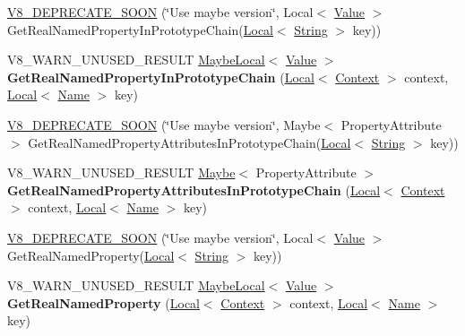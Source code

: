 \begin{DoxyCompactItemize}
\item 
\hyperlink{classv8_1_1Object_a2451d74f20c3c8c5792d2179df34d2de}{V8\+\_\+\+D\+E\+P\+R\+E\+C\+A\+T\+E\+\_\+\+S\+O\+O\+N} (\char`\"{}Use maybe version\char`\"{}, Local$<$ \hyperlink{classv8_1_1Value}{Value} $>$ Get\+Real\+Named\+Property\+In\+Prototype\+Chain(\hyperlink{classv8_1_1Local}{Local}$<$ \hyperlink{classv8_1_1String}{String} $>$ key))
\item 
\hypertarget{classv8_1_1Object_afe68d490fc41783e30126ca547b7fc90}{}V8\+\_\+\+W\+A\+R\+N\+\_\+\+U\+N\+U\+S\+E\+D\+\_\+\+R\+E\+S\+U\+L\+T \hyperlink{classv8_1_1MaybeLocal}{Maybe\+Local}$<$ \hyperlink{classv8_1_1Value}{Value} $>$ {\bfseries Get\+Real\+Named\+Property\+In\+Prototype\+Chain} (\hyperlink{classv8_1_1Local}{Local}$<$ \hyperlink{classv8_1_1Context}{Context} $>$ context, \hyperlink{classv8_1_1Local}{Local}$<$ \hyperlink{classv8_1_1Name}{Name} $>$ key)\label{classv8_1_1Object_afe68d490fc41783e30126ca547b7fc90}

\item 
\hyperlink{classv8_1_1Object_ac5755869ab0b95f6c1bbd3dd123e5cf4}{V8\+\_\+\+D\+E\+P\+R\+E\+C\+A\+T\+E\+\_\+\+S\+O\+O\+N} (\char`\"{}Use maybe version\char`\"{}, Maybe$<$ Property\+Attribute $>$ Get\+Real\+Named\+Property\+Attributes\+In\+Prototype\+Chain(\hyperlink{classv8_1_1Local}{Local}$<$ \hyperlink{classv8_1_1String}{String} $>$ key))
\item 
\hypertarget{classv8_1_1Object_aab7c2e5c5659e95e97488e01b04bf3c8}{}V8\+\_\+\+W\+A\+R\+N\+\_\+\+U\+N\+U\+S\+E\+D\+\_\+\+R\+E\+S\+U\+L\+T \hyperlink{classv8_1_1Maybe}{Maybe}$<$ Property\+Attribute $>$ {\bfseries Get\+Real\+Named\+Property\+Attributes\+In\+Prototype\+Chain} (\hyperlink{classv8_1_1Local}{Local}$<$ \hyperlink{classv8_1_1Context}{Context} $>$ context, \hyperlink{classv8_1_1Local}{Local}$<$ \hyperlink{classv8_1_1Name}{Name} $>$ key)\label{classv8_1_1Object_aab7c2e5c5659e95e97488e01b04bf3c8}

\item 
\hyperlink{classv8_1_1Object_a82e0bc7d399264127f911e4167d730b1}{V8\+\_\+\+D\+E\+P\+R\+E\+C\+A\+T\+E\+\_\+\+S\+O\+O\+N} (\char`\"{}Use maybe version\char`\"{}, Local$<$ \hyperlink{classv8_1_1Value}{Value} $>$ Get\+Real\+Named\+Property(\hyperlink{classv8_1_1Local}{Local}$<$ \hyperlink{classv8_1_1String}{String} $>$ key))
\item 
\hypertarget{classv8_1_1Object_aecec39cefb3e394e1696fe618862efec}{}V8\+\_\+\+W\+A\+R\+N\+\_\+\+U\+N\+U\+S\+E\+D\+\_\+\+R\+E\+S\+U\+L\+T \hyperlink{classv8_1_1MaybeLocal}{Maybe\+Local}$<$ \hyperlink{classv8_1_1Value}{Value} $>$ {\bfseries Get\+Real\+Named\+Property} (\hyperlink{classv8_1_1Local}{Local}$<$ \hyperlink{classv8_1_1Context}{Context} $>$ context, \hyperlink{classv8_1_1Local}{Local}$<$ \hyperlink{classv8_1_1Name}{Name} $>$ key)\label{classv8_1_1Object_aecec39cefb3e394e1696fe618862efec}


\end{DoxyCompactItemize}
